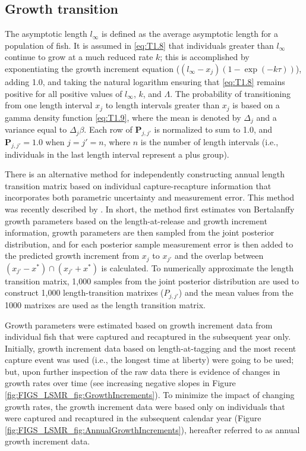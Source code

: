 \subsection{Growth transition} %
\label{sub:growth_transition}
The asymptotic length $l_\infty$ is defined as the average asymptotic length for a population of fish.  It is assumed in \eqref{eq:T1.8} that individuals greater than $l_\infty$ continue to grow at a much reduced rate $k$; this is accomplished by exponentiating the growth increment equation ($(l_\infty-x_j)(1-\exp(-k\tau))$), adding 1.0, and taking the natural logarithm ensuring that \eqref{eq:T1.8} remains positive for all positive values of $l_\infty$, $k$, and $\Lambda$.
The probability of transitioning from one length interval $x_j$ to length intervals greater than $x_{j}$ is based on a gamma density function \eqref{eq:T1.9}, where the mean is denoted by $\Delta_j$ and a variance equal to $\Delta_j \beta$.  Each row of $\mathbf{P}_{j,j'}$ is normalized to sum to 1.0, and $\mathbf{P}_{j,j'}=1.0$ when $j=j'=n$, where $n$ is the number of length intervals (i.e., individuals in the last length interval represent a plus group).

There is an alternative method for independently constructing annual length transition matrix based on individual capture-recapture information that incorporates both parametric uncertainty and measurement error.  This method was recently described by \cite{hillary2010new}. In short, the method first estimates von Bertalanffy growth parameters based on the length-at-release and growth increment information, growth parameters are then sampled from the joint posterior distribution, and for each posterior sample measurement error is then added to the predicted growth increment  from $x_j$ to $x_{j'}$ and the overlap between $(x_{j'}-x^*) \cap (x_{j'}+x^*)$ is calculated.  To numerically approximate the length transition matrix, 1,000 samples from the joint posterior distribution are used to construct 1,000 length-transition matrixes ($P_{j,j'}$) and the mean values from the 1000 matrixes are used as the length transition matrix.

Growth parameters were estimated based on growth increment data from individual fish that were captured and recaptured in the subsequent year only.  Initially, growth increment data based on length-at-tagging and the most recent capture event was used (i.e., the longest time at liberty) were going to be used; but, upon further inspection of the raw data  there is evidence of changes in growth rates over time (see increasing negative slopes in Figure \ref{fig:FIGS_LSMR_fig:GrowthIncrements}).  To minimize the impact of changing growth rates, the growth increment data were based only on individuals that were captured and recaptured in the subsequent calendar year (Figure \ref{fig:FIGS_LSMR_fig:AnnualGrowthIncrements}), hereafter referred to as annual growth increment data.




